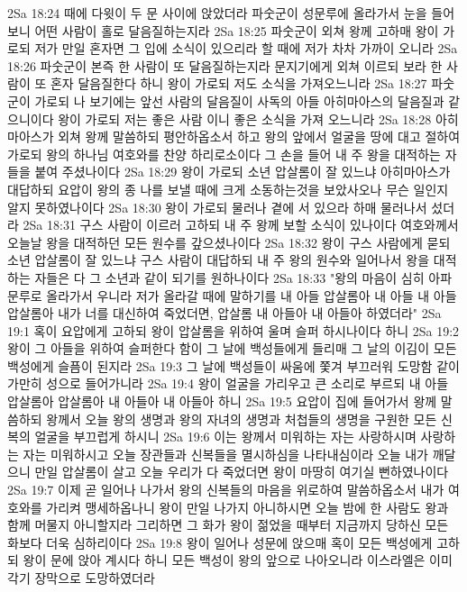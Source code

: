 2Sa 18:24  때에 다윗이 두 문 사이에 앉았더라 파숫군이 성문루에 올라가서 눈을 들어 보니 어떤 사람이 홀로 달음질하는지라
2Sa 18:25  파숫군이 외쳐 왕께 고하매 왕이 가로되 저가 만일 혼자면 그 입에 소식이 있으리라 할 때에 저가 차차 가까이 오니라
2Sa 18:26  파숫군이 본즉 한 사람이 또 달음질하는지라 문지기에게 외쳐 이르되 보라 한 사람이 또 혼자 달음질한다 하니 왕이 가로되 저도 소식을 가져오느니라
2Sa 18:27  파숫군이 가로되 나 보기에는 앞선 사람의 달음질이 사독의 아들 아히마아스의 달음질과 같으니이다 왕이 가로되 저는 좋은 사람 이니 좋은 소식을 가져 오느니라
2Sa 18:28  아히마아스가 외쳐 왕께 말씀하되 평안하옵소서 하고 왕의 앞에서 얼굴을 땅에 대고 절하여 가로되 왕의 하나님 여호와를 찬양 하리로소이다 그 손을 들어 내 주 왕을 대적하는 자들을 붙여 주셨나이다
2Sa 18:29  왕이 가로되 소년 압살롬이 잘 있느냐 아히마아스가 대답하되 요압이 왕의 종 나를 보낼 때에 크게 소동하는것을 보았사오나 무슨 일인지 알지 못하였나이다
2Sa 18:30  왕이 가로되 물러나 곁에 서 있으라 하매 물러나서 섰더라
2Sa 18:31  구스 사람이 이르러 고하되 내 주 왕께 보할 소식이 있나이다 여호와께서 오늘날 왕을 대적하던 모든 원수를 갚으셨나이다
2Sa 18:32  왕이 구스 사람에게 묻되 소년 압살롬이 잘 있느냐 구스 사람이 대답하되 내 주 왕의 원수와 일어나서 왕을 대적하는 자들은 다 그 소년과 같이 되기를 원하나이다
2Sa 18:33  "왕의 마음이 심히 아파 문루로 올라가서 우니라 저가 올라갈 때에 말하기를 내 아들 압살롬아 내 아들 내 아들 압살롬아 내가 너를 대신하여 죽었더면, 압살롬 내 아들아 내 아들아 하였더라"
2Sa 19:1  혹이 요압에게 고하되 왕이 압살롬을 위하여 울며 슬퍼 하시나이다 하니
2Sa 19:2  왕이 그 아들을 위하여 슬퍼한다 함이 그 날에 백성들에게 들리매 그 날의 이김이 모든 백성에게 슬픔이 된지라
2Sa 19:3  그 날에 백성들이 싸움에 쫓겨 부끄러워 도망함 같이 가만히 성으로 들어가니라
2Sa 19:4  왕이 얼굴을 가리우고 큰 소리로 부르되 내 아들 압살롬아 압살롬아 내 아들아 내 아들아 하니
2Sa 19:5  요압이 집에 들어가서 왕께 말씀하되 왕께서 오늘 왕의 생명과 왕의 자녀의 생명과 처첩들의 생명을 구원한 모든 신복의 얼굴을 부끄럽게 하시니
2Sa 19:6  이는 왕께서 미워하는 자는 사랑하시며 사랑하는 자는 미워하시고 오늘 장관들과 신복들을 멸시하심을 나타내심이라 오늘 내가 깨달으니 만일 압살롬이 살고 오늘 우리가 다 죽었더면 왕이 마땅히 여기실 뻔하였나이다
2Sa 19:7  이제 곧 일어나 나가서 왕의 신복들의 마음을 위로하여 말씀하옵소서 내가 여호와를 가리켜 맹세하옵나니 왕이 만일 나가지 아니하시면 오늘 밤에 한 사람도 왕과 함께 머물지 아니할지라 그리하면 그 화가 왕이 젊었을 때부터 지금까지 당하신 모든 화보다 더욱 심하리이다
2Sa 19:8  왕이 일어나 성문에 앉으매 혹이 모든 백성에게 고하되 왕이 문에 앉아 계시다 하니 모든 백성이 왕의 앞으로 나아오니라 이스라엘은 이미 각기 장막으로 도망하였더라
